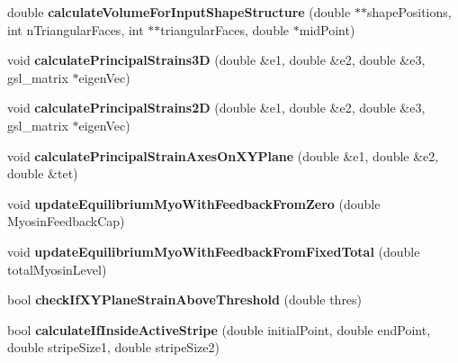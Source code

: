 \begin{DoxyCompactItemize}
\item 
\hypertarget{classShapeBase_ae4e4fe88c885bf0d2448475dd403dadf}{}double {\bfseries calculate\+Volume\+For\+Input\+Shape\+Structure} (double $\ast$$\ast$shape\+Positions, int n\+Triangular\+Faces, int $\ast$$\ast$triangular\+Faces, double $\ast$mid\+Point)\label{classShapeBase_ae4e4fe88c885bf0d2448475dd403dadf}

\item 
\hypertarget{classShapeBase_a3cde54fe712bac297fa73949d07c1bd4}{}void {\bfseries calculate\+Principal\+Strains3\+D} (double \&e1, double \&e2, double \&e3, gsl\+\_\+matrix $\ast$eigen\+Vec)\label{classShapeBase_a3cde54fe712bac297fa73949d07c1bd4}

\item 
\hypertarget{classShapeBase_a6fe833f9684db5cc1847761b6bbd9aa9}{}void {\bfseries calculate\+Principal\+Strains2\+D} (double \&e1, double \&e2, double \&e3, gsl\+\_\+matrix $\ast$eigen\+Vec)\label{classShapeBase_a6fe833f9684db5cc1847761b6bbd9aa9}

\item 
\hypertarget{classShapeBase_a52c8bd76ad2d14cab37563fcdeff1b20}{}void {\bfseries calculate\+Principal\+Strain\+Axes\+On\+X\+Y\+Plane} (double \&e1, double \&e2, double \&tet)\label{classShapeBase_a52c8bd76ad2d14cab37563fcdeff1b20}

\item 
\hypertarget{classShapeBase_a6d50f91e2e243539cfa67b8c0f28612e}{}void {\bfseries update\+Equilibrium\+Myo\+With\+Feedback\+From\+Zero} (double Myosin\+Feedback\+Cap)\label{classShapeBase_a6d50f91e2e243539cfa67b8c0f28612e}

\item 
\hypertarget{classShapeBase_a842a99fa11e8bd7293644ccb0b99ba3a}{}void {\bfseries update\+Equilibrium\+Myo\+With\+Feedback\+From\+Fixed\+Total} (double total\+Myosin\+Level)\label{classShapeBase_a842a99fa11e8bd7293644ccb0b99ba3a}

\item 
\hypertarget{classShapeBase_a61b4685d3e89fae029b56ca3f81fb5d6}{}bool {\bfseries check\+If\+X\+Y\+Plane\+Strain\+Above\+Threshold} (double thres)\label{classShapeBase_a61b4685d3e89fae029b56ca3f81fb5d6}

\item 
\hypertarget{classShapeBase_abfb5933433de7f4f6c58734be0faeac2}{}bool {\bfseries calculate\+If\+Inside\+Active\+Stripe} (double initial\+Point, double end\+Point, double stripe\+Size1, double stripe\+Size2)\label{classShapeBase_abfb5933433de7f4f6c58734be0faeac2}


\end{DoxyCompactItemize}

